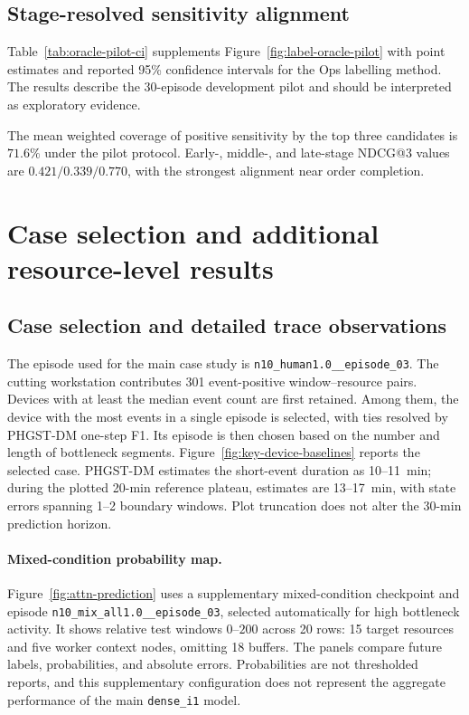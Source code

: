 \documentclass[a4paper,fleqn]{cas-dc}
\begin{document}
\subsection{Stage-resolved sensitivity alignment}

Table~\ref{tab:oracle-pilot-ci} supplements Figure~\ref{fig:label-oracle-pilot} with point estimates and reported 95\% confidence intervals for the Ops labelling method. The results describe the 30-episode development pilot and should be interpreted as exploratory evidence.

\def\CompactOracleTable{1}


The mean weighted coverage of positive sensitivity by the top three candidates is $71.6\%$ under the pilot protocol. Early-, middle-, and late-stage NDCG@3 values are $0.421/0.339/0.770$, with the strongest alignment near order completion. 

\section{Case selection and additional resource-level results}\label{app:case-details}

\subsection{Case selection and detailed trace observations}

The episode used for the main case study is \texttt{n10\_human1.0\_\_episode\_03}. The cutting workstation contributes 301 event-positive window--resource pairs. Devices with at least the median event count are first retained. Among them, the device with the most events in a single episode is selected, with ties resolved by PHGST-DM one-step F1. Its episode is then chosen based on the number and length of bottleneck segments. Figure~\ref{fig:key-device-baselines} reports the selected case. PHGST-DM estimates the short-event duration as 10--11~min; during the plotted 20-min reference plateau, estimates are 13--17~min, with state errors spanning 1--2 boundary windows. Plot truncation does not alter the 30-min prediction horizon.











\paragraph*{Mixed-condition probability map.}
Figure~\ref{fig:attn-prediction} uses a supplementary mixed-condition checkpoint and episode \texttt{n10\_mix\_all1.0\_\_episode\_03}, selected automatically for high bottleneck activity. It shows relative test windows $0$--$200$ across 20 rows: 15 target resources and five worker context nodes, omitting 18 buffers. The panels compare future labels, probabilities, and absolute errors. Probabilities are not thresholded reports, and this supplementary configuration does not represent the aggregate performance of the main \texttt{dense\_i1} model.
\end{document}
